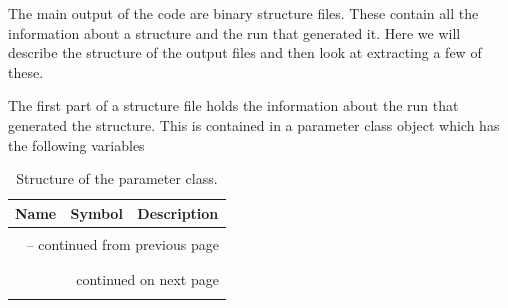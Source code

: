 \documentclass[11pt, oneside]{article}   	%
\begin{document}
The main output of the code are binary structure files. These contain all the information about a structure and the run that generated it. Here we will describe the structure of the output files and then look at extracting a few of these.

The first part of a structure file holds the information about the run that generated the structure. This is contained in a parameter class object which has the following variables

\clearpage
\begin{longtable}{l l p{10cm}}
\caption{Structure of the parameter class.}
\label{tab:parameters_class} \\

Name & Symbol & Description \\ \hline \hline
\multicolumn{3}{l}{} \\
\endfirsthead

\multicolumn{3}{c}{{\tablename\ \thetable{} -- continued from previous page}} \\
\multicolumn{3}{l}{} \\
\endhead

\multicolumn{3}{l}{} \\
\multicolumn{3}{r}{{continued on next page}} \\
\endfoot

\endlastfoot


\end{longtable}
\end{document}
